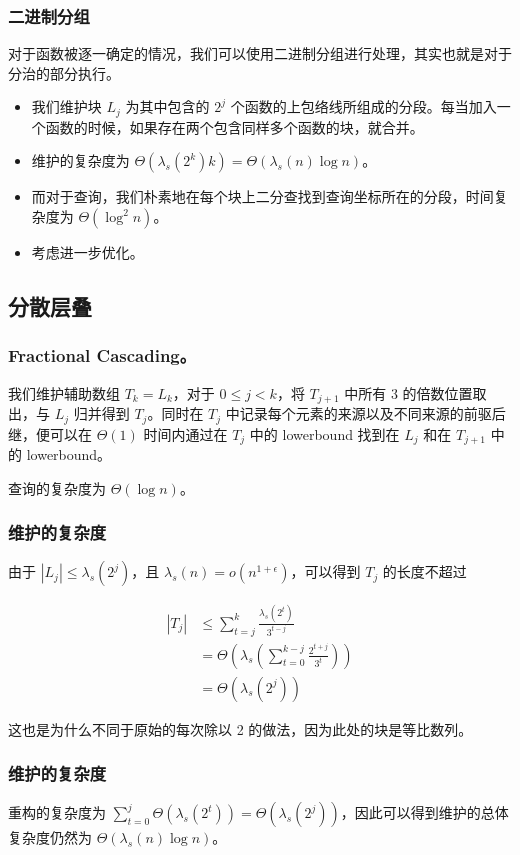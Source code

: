 \documentclass[mathserif]{ctexbeamer}
\begin{document}
\frame
{
  \frametitle{二进制分组}

  对于函数被逐一确定的情况，我们可以使用二进制分组进行处理，其实也就是对于分治的部分执行。
  
  \begin{itemize}
  \item<1->我们维护块 $L_j$ 为其中包含的 $2^j$ 个函数的上包络线所组成的分段。每当加入一个函数的时候，如果存在两个包含同样多个函数的块，就合并。

  \item<2->维护的复杂度为 $\Theta(\lambda_s(2^k)k) = \Theta(\lambda_s(n)\log n)$。

  \item<3->而对于查询，我们朴素地在每个块上二分查找到查询坐标所在的分段，时间复杂度为 $\Theta(\log^2 n)$。
  
  \item<4->考虑进一步优化。
  \end{itemize}
}

\subsection{分散层叠}

\frame
{
  \frametitle{Fractional Cascading。}
  
  我们维护辅助数组 $T_k = L_k$，对于 $0\le j< k$，将 $T_{j+1}$ 中所有 3 的倍数位置取出，与 $L_j$ 归并得到 $T_j$。同时在 $T_j$ 中记录每个元素的来源以及不同来源的前驱后继，便可以在 $\Theta(1)$ 时间内通过在 $T_j$ 中的 lowerbound 找到在 $L_j$ 和在 $T_{j+1}$ 中的 lowerbound。
  
  查询的复杂度为 $\Theta(\log n)$。
}

\frame
{
  \frametitle{维护的复杂度}
  
  由于 $|L_j| \le \lambda_s(2^j)$，且 $\lambda_s(n) = o(n^{1+\epsilon})$，可以得到 $T_j$ 的长度不超过

\begin{align*}
|T_j| & \le \sum_{t = j}^k \frac{\lambda_s(2^t)}{3^{t-j}} \\
    & = \Theta \left( \lambda_s \left( \sum_{t=0}^{k-j} \frac{2^{t+j}}{3^t} \right) \right)\\
    & = \Theta(\lambda_s(2^j))
\end{align*}


  这也是为什么不同于原始的每次除以 2 的做法，因为此处的块是等比数列。
}

\frame
{
  \frametitle{维护的复杂度}
  
  重构的复杂度为 $ \sum_{t=0}^j \Theta(\lambda_s(2^t)) = \Theta(\lambda_s(2^j))$，因此可以得到维护的总体复杂度仍然为 $\Theta(\lambda_s(n)\log n)$。
}
\end{document}

